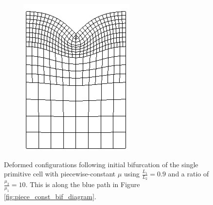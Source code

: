 \documentclass[11pt]{report}
\begin{document}
\begin{figure}[!htb]
\begin{center}
\begin{subfigure}[b]{0.22\textwidth}
		\includegraphics[width=\textwidth]{mesh/mesh_piece_const_10_9_1_super}
	\end{subfigure}
\end{center}
	\captionsetup{format=hang}
	\caption{Deformed configurations following initial bifurcation of the single primitive cell with piecewise-constant $\mu$ using $\frac{L_1}{L_2} = 0.9$ and a ratio of $\frac{\mu_2}{\mu_1} = 10$. This is along the blue path in Figure \ref{fig:piece_const_bif_diagram}.}
    \label{fig:mesh_piece_const_10_9_1}
\end{figure}
\end{document}
